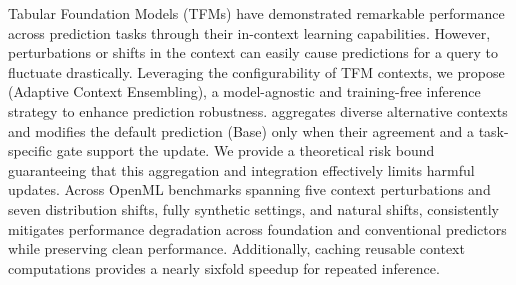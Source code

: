 Tabular Foundation Models (TFMs) have demonstrated remarkable performance
across prediction tasks through their in-context learning capabilities.
However, perturbations or shifts in the context can easily cause predictions
for a query to fluctuate drastically. Leveraging the configurability of TFM
contexts, we propose \textbf{\method{}} (Adaptive Context Ensembling), a model-agnostic
and training-free inference strategy to enhance prediction robustness.
\method{} aggregates diverse alternative contexts and modifies the default
prediction (Base) only when their agreement and a task-specific gate support
the update. We provide a theoretical risk
bound guaranteeing that this aggregation and integration effectively limits
harmful updates. Across OpenML benchmarks spanning five context perturbations
and seven distribution shifts, fully synthetic settings, and natural shifts,
\method{} consistently mitigates performance degradation across foundation and
conventional predictors while preserving clean performance. Additionally,
caching reusable context computations provides a nearly sixfold speedup for
repeated inference.
